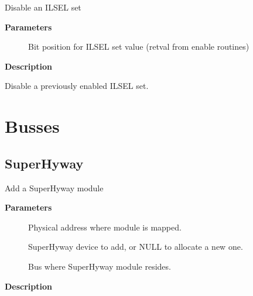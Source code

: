 \documentclass[a4paper,8pt,english]{sphinxmanual}
\begin{document}
\begin{fulllineitems}
\label{sh/index:c.ilsel_disable}
Disable an ILSEL set

\end{fulllineitems}


\textbf{Parameters}
\begin{description}
\item[{}] \leavevmode
Bit position for ILSEL set value (retval from enable routines)

\end{description}

\textbf{Description}

Disable a previously enabled ILSEL set.


\chapter{Busses}
\label{sh/index:busses}

\section{SuperHyway}
\label{sh/index:superhyway}

\begin{fulllineitems}
\label{sh/index:c.superhyway_add_device}
Add a SuperHyway module

\end{fulllineitems}


\textbf{Parameters}
\begin{description}
\item[{}] \leavevmode
Physical address where module is mapped.

\item[{}] \leavevmode
SuperHyway device to add, or NULL to allocate a new one.

\item[{}] \leavevmode
Bus where SuperHyway module resides.

\end{description}

\textbf{Description}
\end{document}
